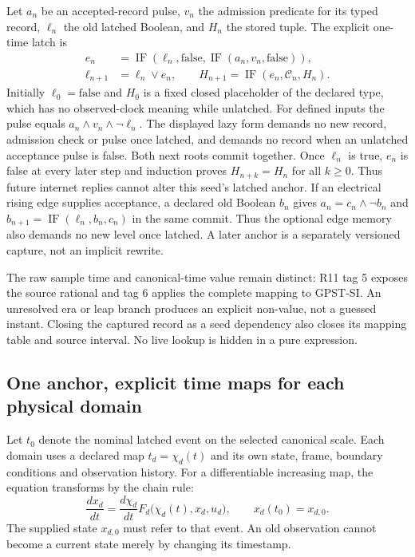 Let $a_n$ be an accepted-record pulse, $v_n$ the admission predicate for its
typed record, $\ell_n$ the old latched Boolean, and $H_n$ the stored tuple.
The explicit one-time latch is
\begin{align}
 e_n&=\operatorname{IF}(\ell_n,\mathrm{false},
       \operatorname{IF}(a_n,v_n,\mathrm{false})),\nonumber\\
 \ell_{n+1}&=\ell_n\vee e_n,\qquad
 H_{n+1}=\operatorname{IF}(e_n,\mathcal C_n,H_n).
 \label{eq:r14-clock-latch}
\end{align}
Initially $\ell_0=\mathrm{false}$ and $H_0$ is a fixed closed placeholder of
the declared type, which has no observed-clock meaning while unlatched.
For defined inputs the pulse equals $a_n\wedge v_n\wedge\neg\ell_n$.
The displayed lazy form demands no new record, admission check or pulse once
latched, and demands no record when an unlatched acceptance pulse is false.
Both next roots commit together. Once $\ell_n$ is true, $e_n$ is false at
every later step and induction proves $H_{n+k}=H_n$ for all $k\geq0$.
Thus future internet replies cannot alter this seed's latched anchor.
If an electrical rising edge supplies acceptance, a declared old Boolean
$b_n$ gives $a_n=c_n\wedge\neg b_n$ and
$b_{n+1}=\operatorname{IF}(\ell_n,b_n,c_n)$ in the same commit.
Thus the optional edge memory also demands no new level once latched.
A later anchor is a separately versioned capture, not an implicit rewrite.

The raw sample time and canonical-time value remain distinct: R11 tag 5
exposes the source rational and tag 6 applies the complete 
mapping to GPST-SI. An unresolved era or leap branch produces an explicit
non-value, not a guessed instant. Closing the captured record as a seed
dependency also closes its mapping table and source interval. No live lookup
is hidden in a pure expression.

\subsection{One anchor, explicit time maps for each physical domain}
Let $t_0$ denote the nominal latched event on the selected canonical scale.
Each domain uses a declared map $t_d=\chi_d(t)$ and its own state, frame,
boundary conditions and observation history. For a differentiable increasing
map, the equation transforms by the chain rule:
\begin{equation}
 \frac{dx_d}{dt}=\frac{d\chi_d}{dt}
 F_d\bigl(\chi_d(t),x_d,u_d\bigr),\qquad x_d(t_0)=x_{d,0}.
 \label{eq:r14-domain-time-map}
\end{equation}
The supplied state $x_{d,0}$ must refer to that event. An old observation
cannot become a current state merely by changing its timestamp.

